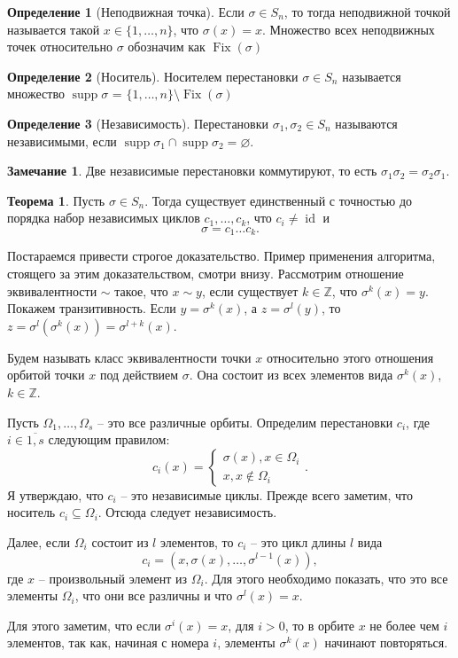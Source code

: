 \documentclass[10pt,a4paper,oneside]{book}
\theoremstyle{definition}
\newtheorem*{rem}{\color{green!50!blue}Замечание}
\newtheorem*{defn}{\color{yellow!30!red} Определение}
\newtheorem{thm}{\color{red!40!black}Теорема}
\newcommand{\mb}[1]{\mathbb{#1}}
\newcommand{\ovl}{\overline}
\newcommand{\id}{\operatorname{id}}
\newcommand{\Fix}{\operatorname{Fix}}
\newcommand{\supp}{\operatorname{supp}}
\def\thrm{\begin{thm}}
\def\ethrm{\end{thm}}
\def\dfn{\begin{defn}}
\def\edfn{\end{defn}}
\def\rm{\begin{rem}}
\def\erm{\end{rem}}
\begin{document}
\dfn[Неподвижная точка] Если $\sigma \in S_n$, то тогда неподвижной точкой называется такой $x\in \{1,\dots,n\}$, что $\sigma(x)=x$. Множество всех неподвижных точек относительно $\sigma$ обозначим как $\Fix(\sigma)$ 
\edfn

\dfn[Носитель] Носителем перестановки $\sigma \in S_n$ называется множество $\supp \sigma$ = $\{1,\dots,n\}\setminus \Fix(\sigma)$
\edfn

\dfn[Независимость] Перестановки $\sigma_1,\sigma_2\in S_n$ называются независимыми, если $\supp \sigma_1 \cap \supp \sigma_2=\varnothing$.
\edfn

\rm Две независимые перестановки коммутируют, то есть $\sigma_1\sigma_2=\sigma_2\sigma_1$.
\erm

\thrm Пусть $\sigma \in S_n$. Тогда существует единственный с точностью до порядка набор независимых циклов $c_1,\dots,c_k$, что $c_i\neq \id$ и 
$$\sigma=c_1\dots c_k.$$
\ethrm
\proof Постараемся привести строгое доказательство. Пример применения алгоритма, стоящего за этим доказательством, смотри внизу. Рассмотрим отношение эквивалентности $\sim$ такое, что $x\sim y$, если существует $k\in \mb Z$, что $\sigma^k(x)=y$. Покажем транзитивность. Если $y=\sigma^k(x)$, а $z=\sigma^l(y)$, то $z=\sigma^l(\sigma^k (x))= \sigma^{l+k}(x)$.

Будем называть класс эквивалентности точки $x$ относительно этого отношения орбитой точки $x$ под действием $\sigma$. Она состоит из всех элементов вида $\sigma^k(x)$, $k \in \mb Z$.

Пусть $\Omega_1,\dots,\Omega_s$ -- это все различные орбиты. Определим перестановки $c_i$, где $i\in\ovl{1,s}$ следующим правилом:
$$c_i(x)=\begin{cases} \sigma(x), x\in \Omega_i\\
x, x\notin \Omega_i
\end{cases}.$$
Я утверждаю, что $c_i$ -- это независимые циклы. Прежде всего заметим, что носитель $c_i \subseteq \Omega_i$. Отсюда следует независимость.

Далее, если $\Omega_i$ состоит из $l$ элементов, то $c_i$ -- это цикл длины $l$ вида 
$$c_i=(x,\sigma(x),\dots,\sigma^{l-1}(x)), $$ где $x$ -- произвольный элемент из $\Omega_i$. Для этого необходимо показать, что это все элементы $\Omega_i$, что они все различны и что $\sigma^l(x)=x$.

Для этого заметим, что если $\sigma^i(x)=x$, для $i>0$, то в орбите $x$ не более чем $i$ элементов, так как, начиная с номера $i$, элементы $\sigma^k(x)$ начинают повторяться.
\end{document}
